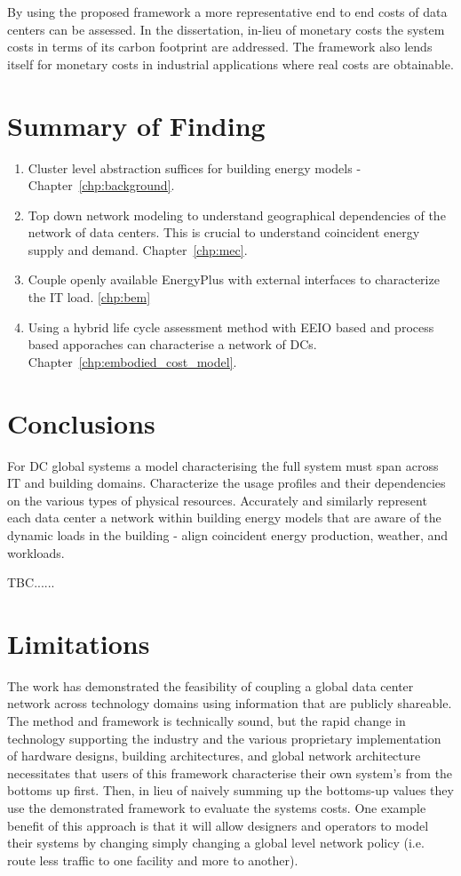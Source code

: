 By using the proposed framework a more representative end to end costs of data centers can be assessed. In the dissertation, in-lieu of monetary costs the system costs in terms of its carbon footprint are addressed. The framework also lends itself for monetary costs in industrial applications where real costs are obtainable.

\section{Summary of Finding}
\begin{enumerate}
    \item Cluster level abstraction suffices for building energy models - Chapter~\ref{chp:background}.
    \item Top down network modeling to understand geographical dependencies of the network of data centers. This is crucial to understand coincident energy supply and demand. Chapter~\ref{chp:mec}.
    \item Couple openly available EnergyPlus with external interfaces to characterize the IT load. \ref{chp:bem}
    \item Using a hybrid life cycle assessment method with EEIO based and process based apporaches can characterise a network of DCs. Chapter~\ref{chp:embodied_cost_model}.
\end{enumerate}

\section{Conclusions}
For DC global systems a model characterising the full system must span across IT and building domains. Characterize the usage profiles and their dependencies on the various types of physical resources. Accurately and similarly represent each data center a network within building energy models that are aware of the dynamic loads in the building - align coincident energy production, weather, and workloads.

TBC......

\section{Limitations}
The work has demonstrated the feasibility of coupling a global data center network across technology domains using information that are publicly shareable. The method and framework is technically sound, but the rapid change in technology supporting the industry and the various proprietary implementation of hardware designs, building architectures, and global network architecture necessitates that users of this framework characterise their own system's from the bottoms up first. Then, in lieu of naively summing up the bottoms-up values they use the demonstrated framework to evaluate the systems costs. One example benefit of this approach is that it will allow designers and operators to model their systems by changing simply changing a global level network policy (i.e. route less traffic to one facility and more to another).

